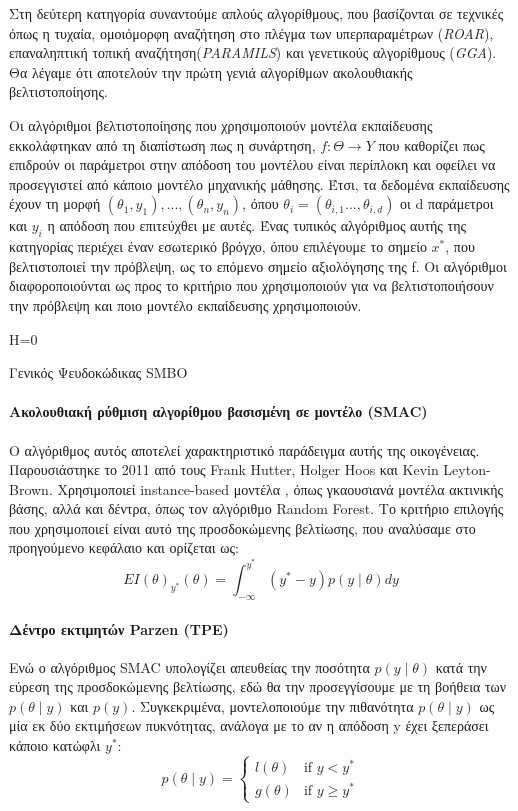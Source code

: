 \documentclass{article}
\newenvironment{myalgorithm}[1][htb]
  {\renewcommand{\algorithmcfname}{Αλγόριθμος}%
   \begin{algorithm}[#1]%
  }{\end{algorithm}}
\begin{document}
Στη δεύτερη κατηγορία συναντούμε απλούς αλγορίθμους, που βασίζονται σε τεχνικές όπως η τυχαία, ομοιόμορφη  αναζήτηση στο πλέγμα των υπερπαραμέτρων (\textit{ROAR}), επαναληπτική τοπική αναζήτηση(\textit{PARAMILS}) και γενετικούς αλγορίθμους (\textit{GGA}). Θα λέγαμε ότι αποτελούν την πρώτη γενιά  αλγορίθμων ακολουθιακής βελτιστοποίησης.

Οι αλγόριθμοι βελτιστοποίησης που χρησιμοποιούν μοντέλα εκπαίδευσης εκκολάφτηκαν από τη διαπίστωση πως η συνάρτηση, $f: \Theta \rightarrow Y$ που καθορίζει πως επιδρούν οι παράμετροι στην απόδοση του μοντέλου είναι περίπλοκη και οφείλει να προσεγγιστεί από κάποιο μοντέλο μηχανικής μάθησης. Έτσι, τα δεδομένα εκπαίδευσης έχουν τη μορφή ${(\theta_1,y_1),...,(\theta_n,y_n)}$, όπου $\theta_i=(\theta_{i,1}..., \theta_{i,d})$ οι d παράμετροι και $y_i$ η απόδοση που επιτεύχθει με αυτές. Ένας τυπικός αλγόριθμος αυτής της κατηγορίας περιέχει έναν εσωτερικό βρόγχο, όπου επιλέγουμε το σημείο $x^*$, που βελτιστοποιεί την πρόβλεψη, ως το επόμενο σημείο αξιολόγησης της f. Οι αλγόριθμοι διαφοροποιούνται ως προς το κριτήριο που χρησιμοποιούν για να βελτιστοποιήσουν την πρόβλεψη και ποιο μοντέλο εκπαίδευσης χρησιμοποιούν.
\begin{myalgorithm}[H]
H=0\;
 \caption{Γενικός Ψευδοκώδικας SΜΒΟ}
\end{myalgorithm}
\paragraph{Ακολουθιακή ρύθμιση αλγορίθμου βασισμένη σε μοντέλο (SMAC)} Ο αλγόριθμος αυτός αποτελεί χαρακτηριστικό παράδειγμα αυτής της οικογένειας. Παρουσιάστηκε το 2011 από τους Frank Hutter, Holger Hoos και Kevin Leyton-Brown. Χρησιμοποιεί instance-based μοντέλα , όπως γκαουσιανά  μοντέλα ακτινικής βάσης, αλλά και δέντρα, όπως τον αλγόριθμο Random Forest. Το κριτήριο επιλογής που χρησιμοποιεί είναι αυτό της προσδοκώμενης βελτίωσης, που αναλύσαμε στο προηγούμενο κεφάλαιο και ορίζεται ως:
$$EI(\theta)_{y^*} (\theta)= \int_{- \infty}^{y^*} (y^* - y) p(y \mid \theta) dy$$ 
\paragraph{Δέντρο εκτιμητών Parzen (TPE)}
Ενώ ο αλγόριθμος SMAC υπολογίζει απευθείας την ποσότητα $p(y \mid \theta)$ κατά την εύρεση της προσδοκώμενης βελτίωσης, εδώ θα την προσεγγίσουμε με τη βοήθεια των  $p(\theta \mid y)$ και $ p(y)$. Συγκεκριμένα, μοντελοποιούμε την πιθανότητα $p(\theta \mid y)$ ως μία εκ δύο εκτιμήσεων πυκνότητας, ανάλογα με το αν η απόδοση y έχει ξεπεράσει κάποιο κατώφλι $y^*$:
$$p(\theta \mid y)=\left\{
	\begin{array}{ll}
		l(\theta)  & \mbox{if } y < y^* \\
		g(\theta)  & \mbox{if } y \geq y^*
	\end{array}
\right.$$
\end{document}
